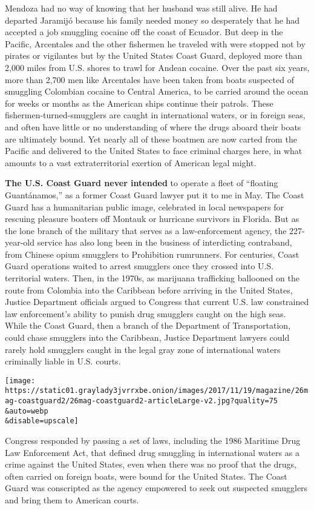 Mendoza had no way of knowing that her husband was still alive. He had
departed Jaramijó because his family needed money so desperately that he
had accepted a job smuggling cocaine off the coast of Ecuador. But deep
in the Pacific, Arcentales and the other fishermen he traveled with were
stopped not by pirates or vigilantes but by the United States Coast
Guard, deployed more than 2,000 miles from U.S. shores to trawl for
Andean cocaine. Over the past six years, more than 2,700 men like
Arcentales have been taken from boats suspected of smuggling Colombian
cocaine to Central America, to be carried around the ocean for weeks or
months as the American ships continue their patrols. These
fishermen-turned-smugglers are caught in international waters, or in
foreign seas, and often have little or no understanding of where the
drugs aboard their boats are ultimately bound. Yet nearly all of these
boatmen are now carted from the Pacific and delivered to the United
States to face criminal charges here, in what amounts to a vast
extraterritorial exertion of American legal might.

\textbf{The U.S. Coast Guard never intended} to operate a fleet of
``floating Guantánamos,'' as a former Coast Guard lawyer put it to me in
May. The Coast Guard has a humanitarian public image, celebrated in
local newspapers for rescuing pleasure boaters off Montauk or hurricane
survivors in Florida. But as the lone branch of the military that serves
as a law-enforcement agency, the 227-year-old service has also long been
in the business of interdicting contraband, from Chinese opium smugglers
to Prohibition rumrunners. For centuries, Coast Guard operations waited
to arrest smugglers once they crossed into U.S. territorial waters.
Then, in the 1970s, as marijuana trafficking ballooned on the route from
Colombia into the Caribbean before arriving in the United States,
Justice Department officials argued to Congress that current U.S. law
constrained law enforcement's ability to punish drug smugglers caught on
the high seas. While the Coast Guard, then a branch of the Department of
Transportation, could chase smugglers into the Caribbean, Justice
Department lawyers could rarely hold smugglers caught in the legal gray
zone of international waters criminally liable in U.S. courts.

\texttt{[image: https://static01.graylady3jvrrxbe.onion/images/2017/11/19/magazine/26mag-coastguard2/26mag-coastguard2-articleLarge-v2.jpg?quality=75\\\&auto=webp\\\&disable=upscale]}

Congress responded by passing a set of laws, including the 1986 Maritime
Drug Law Enforcement Act, that defined drug smuggling in international
waters as a crime against the United States, even when there was no
proof that the drugs, often carried on foreign boats, were bound for the
United States. The Coast Guard was conscripted as the agency empowered
to seek out suspected smugglers and bring them to American courts.

